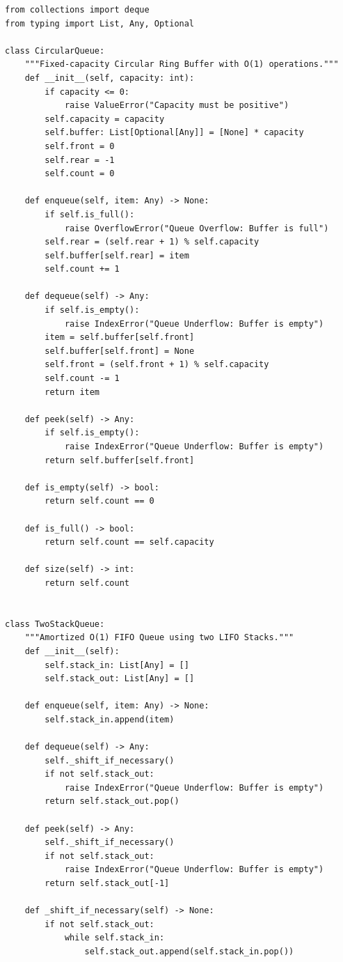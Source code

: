 \documentclass[10pt,journal,compsoc,onecolumn]{IEEEtran}
\begin{document}
\begin{verbatim}
from collections import deque
from typing import List, Any, Optional

class CircularQueue:
    """Fixed-capacity Circular Ring Buffer with O(1) operations."""
    def __init__(self, capacity: int):
        if capacity <= 0:
            raise ValueError("Capacity must be positive")
        self.capacity = capacity
        self.buffer: List[Optional[Any]] = [None] * capacity
        self.front = 0
        self.rear = -1
        self.count = 0

    def enqueue(self, item: Any) -> None:
        if self.is_full():
            raise OverflowError("Queue Overflow: Buffer is full")
        self.rear = (self.rear + 1) % self.capacity
        self.buffer[self.rear] = item
        self.count += 1

    def dequeue(self) -> Any:
        if self.is_empty():
            raise IndexError("Queue Underflow: Buffer is empty")
        item = self.buffer[self.front]
        self.buffer[self.front] = None
        self.front = (self.front + 1) % self.capacity
        self.count -= 1
        return item

    def peek(self) -> Any:
        if self.is_empty():
            raise IndexError("Queue Underflow: Buffer is empty")
        return self.buffer[self.front]

    def is_empty(self) -> bool:
        return self.count == 0

    def is_full() -> bool:
        return self.count == self.capacity

    def size(self) -> int:
        return self.count


class TwoStackQueue:
    """Amortized O(1) FIFO Queue using two LIFO Stacks."""
    def __init__(self):
        self.stack_in: List[Any] = []
        self.stack_out: List[Any] = []

    def enqueue(self, item: Any) -> None:
        self.stack_in.append(item)

    def dequeue(self) -> Any:
        self._shift_if_necessary()
        if not self.stack_out:
            raise IndexError("Queue Underflow: Buffer is empty")
        return self.stack_out.pop()

    def peek(self) -> Any:
        self._shift_if_necessary()
        if not self.stack_out:
            raise IndexError("Queue Underflow: Buffer is empty")
        return self.stack_out[-1]

    def _shift_if_necessary(self) -> None:
        if not self.stack_out:
            while self.stack_in:
                self.stack_out.append(self.stack_in.pop())


\end{verbatim}
\end{document}
